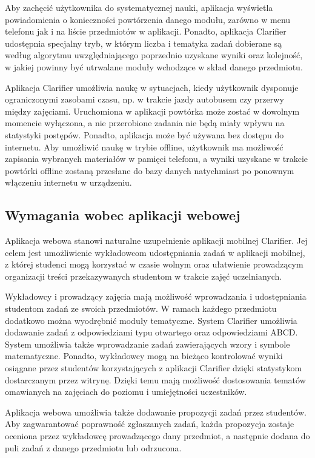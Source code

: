 \documentclass{pracamgr}
\begin{document}
Aby zachęcić użytkownika do systematycznej nauki, aplikacja wyświetla powiadomienia o konieczności powtórzenia danego modułu, zarówno w menu telefonu jak i na liście przedmiotów w aplikacji. Ponadto, aplikacja Clarifier udostępnia specjalny tryb, w którym liczba i tematyka zadań dobierane są według algorytmu uwzględniającego poprzednio uzyskane wyniki oraz kolejność, w jakiej powinny być utrwalane moduły wchodzące w skład danego przedmiotu.  

Aplikacja Clarifier umożliwia naukę w sytuacjach, kiedy użytkownik dysponuje ograniczonymi zasobami czasu, np. w trakcie jazdy autobusem czy przerwy między zajęciami. Uruchomiona w aplikacji powtórka może zostać w dowolnym momencie wyłączona, a nie przerobione zadania nie będą miały wpływu na statystyki postępów. Ponadto, aplikacja może być używana bez dostępu do internetu. Aby umożliwić naukę w trybie offline, użytkownik ma możliwość zapisania wybranych materiałów w pamięci telefonu, a wyniki uzyskane w trakcie powtórki offline zostaną przesłane do bazy danych natychmiast po ponownym włączeniu internetu w urządzeniu.

\subsection{Wymagania wobec aplikacji webowej}
Aplikacja webowa stanowi naturalne uzupełnienie aplikacji mobilnej Clarifier. Jej celem jest umożliwienie wykładowcom udostępniania zadań w aplikacji mobilnej, z której studenci mogą korzystać w czasie wolnym oraz ułatwienie prowadzącym organizacji treści przekazywanych studentom w trakcie zajęć uczelnianych. 

Wykładowcy i prowadzący zajęcia mają możliwość wprowadzania i udostępniania studentom zadań ze swoich przedmiotów. W ramach każdego przedmiotu dodatkowo można wyodrębnić moduły tematyczne. System Clarifier umożliwia dodawanie zadań z odpowiedziami typu otwartego oraz odpowiedziami ABCD. System umożliwia także wprowadzanie zadań zawierających wzory i symbole matematyczne. Ponadto, wykładowcy mogą na bieżąco kontrolować wyniki osiągane przez studentów korzystających z aplikacji Clarifier dzięki statystykom dostarczanym przez witrynę. Dzięki temu mają możliwość dostosowania tematów omawianych na zajęciach do poziomu i umiejętności uczestników.

Aplikacja webowa umożliwia także dodawanie propozycji zadań przez studentów. Aby zagwarantować poprawność zgłaszanych zadań, każda propozycja zostaje oceniona przez wykładowcę prowadzącego dany przedmiot, a następnie dodana do puli zadań z danego przedmiotu lub odrzucona.
\end{document}
